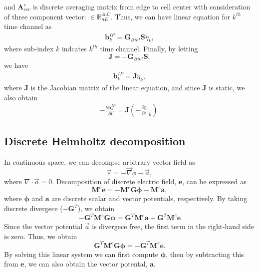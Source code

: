 \documentclass[a4paper, 11pt]{article}
\renewcommand{\div}{\nabla\cdot}
\newcommand{\grad}{\vec \nabla}
\newcommand{\dgrad}{{\mathbf G}}
\newcommand{\M}{{\mathbf M}}
\newcommand{\Me}{{\M^e}}
\newcommand {\e}  { {\vec e} }
\newcommand {\db}  { {\mathbf{b} } }
\newcommand {\de}  { {\mathbf{e} } }
\newcommand{\Gbiot}{\mathbf{G}_{Biot}}
\newcommand{\peta}{\tilde{\eta}}
\begin{document}
and $\mathbf{A}^{e}_{ccv}$ is discrete averaging matrix from edge to cell center with consideration of three component vector: $\in \mathbb{R}^{3nC}_{nE}$. 
Thus, we can have linear equation for $k^{th}$ time channel as
\begin{eqnarray*}
  \db^{IP}_k = \Gbiot \mathbf{S} \peta_k,
\end{eqnarray*}
where sub-index $k$ indcates $k^{th}$ time channel. Finally, by letting
\begin{equation}
  \mathbf{J} = -\Gbiot\mathbf{S},
  \label{eq: Sense}
\end{equation}
we have
\begin{eqnarray}
  \db^{IP}_k = \mathbf{J}\peta_k,
  \label{eq: bIP_linear}
\end{eqnarray}
where $\mathbf{J}$ is the Jacobian matrix of the linear equation, and since $\mathbf{J}$ is static, we also obtain
\begin{eqnarray}
  -\frac{\partial\db^{IP}_k}{\partial t} = \mathbf{J}(-\frac{\partial \peta}{\partial t}\Big|_k).
  \label{eq: dbIPdt_linear}
\end{eqnarray}

\subsection{Discrete Helmholtz decomposition}
\label{section:helmholtz}
In continuous space, we can decompse arbitrary vector field as 
\begin{equation}
  \e = -\grad\phi -\vec{a},
\end{equation}
where $\div \vec{a} = 0$. 
Decomposition of discrete electric field, $\de$, can be expressed as
\begin{equation}
  \Me\de = -\Me\dgrad \boldsymbol{\phi} -\Me\mathbf{a},
\end{equation}
where $\boldsymbol{\phi}$ and $\mathbf{a}$ are discrete scalar and vector potentials, respectively. 
By taking discrete divergece ($-\dgrad^T$), we obtain
\begin{equation}
  -\dgrad^T\Me\dgrad\boldsymbol{\phi} = \dgrad^T\Me\mathbf{a} + \dgrad^T\Me\de
\end{equation}
Since the vector potential $\vec{a}$ is divergece free, the first term in the right-hand side is zero. Thus, we obtain
\begin{equation}
  \dgrad^T\Me\dgrad\boldsymbol{\phi} = -\dgrad^T\Me\de. 
\end{equation}
By solving this linear system we can first compute $\boldsymbol{\phi}$, then by subtracting this from $\de$, we can also obtain the vector potental, $\mathbf{a}$. 



\end{document}

